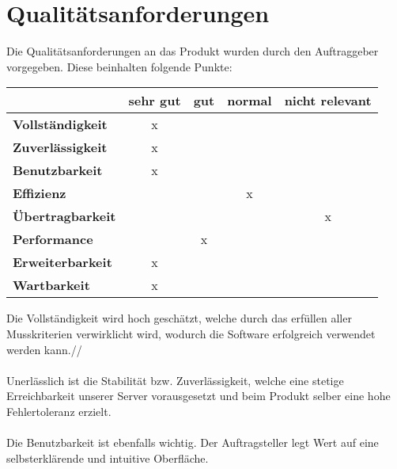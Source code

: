 \section{Qualitätsanforderungen}
    Die Qualitätsanforderungen an das Produkt wurden durch den Auftraggeber vorgegeben. Diese beinhalten folgende Punkte:

    \begin{center}
        \begin{tabular}{ |c|c|c|c|c| }
             \hline
                                & sehr gut & gut & normal & nicht relevant \\
             \hline
                \multicolumn{1}{|l|}{\textbf{Vollständigkeit}}  & x & & & \\
             \hline
                \multicolumn{1}{|l|}{\textbf{Zuverlässigkeit}}  & x & & & \\
             \hline
                \multicolumn{1}{|l|}{\textbf{Benutzbarkeit}}    & x & & & \\
             \hline
                \multicolumn{1}{|l|}{\textbf{Effizienz}}        & & & x & \\
             \hline
                \multicolumn{1}{|l|}{\textbf{Übertragbarkeit}}  & & & & x \\
             \hline
                \multicolumn{1}{|l|}{\textbf{Performance}}      & & x & & \\
             \hline
                \multicolumn{1}{|l|}{\textbf{Erweiterbarkeit}}  & x & & & \\
             \hline
                \multicolumn{1}{|l|}{\textbf{Wartbarkeit}}      & x & & & \\
             \hline
        \end{tabular}
    \end{center}
    Die Vollständigkeit wird hoch geschätzt, welche durch das erfüllen aller Musskriterien verwirklicht wird, wodurch die Software erfolgreich verwendet werden kann.//
    \\ \\
    Unerlässlich ist die Stabilität bzw. Zuverlässigkeit, welche eine stetige Erreichbarkeit unserer Server vorausgesetzt und beim Produkt selber eine hohe Fehlertoleranz erzielt.
    \\ \\
    Die Benutzbarkeit ist ebenfalls wichtig. Der Auftragsteller legt Wert auf eine selbsterklärende und intuitive Oberfläche.
    \\ \\
